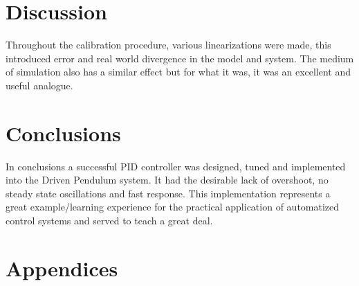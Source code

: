 \documentclass[a4paper,11pt]{article}
\begin{document}
\section{Discussion}
Throughout the calibration procedure, various linearizations were made, this introduced error and real world divergence in the model and system. The medium of simulation also has a similar effect but for what it was, it was an excellent and useful analogue.

\section{Conclusions}
In conclusions a successful PID controller was designed, tuned and implemented into the Driven Pendulum system. It had the desirable lack of overshoot, no steady state oscillations and fast response. This implementation represents a great example/learning experience for the practical application of automatized control systems and served to teach a great deal.  

\newpage
\section*{Appendices}
\end{document}
